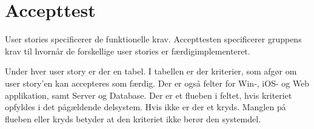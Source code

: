 \chapter{Accepttest}


User stories specificerer de funktionelle krav. Accepttesten specificerer gruppens krav til hvornår de forskellige user stories er færdigimplementeret. 

Under hver user story er der en tabel. I tabellen er der kriterier, som afgør om user story'en kan accepteres som færdig. Der er også felter for Win-, iOS- og Web applikation, samt Server og Database. Der er et flueben i feltet, hvis kriteriet opfyldes i det pågældende delsystem.
Hvis ikke er der et kryds. Manglen på flueben eller kryds betyder at den kriteriet ikke berør den systemdel.


